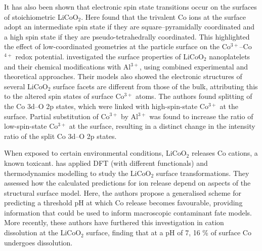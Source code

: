 \documentclass[../main.tex]{subfiles}
\begin{document}
It has also been shown that electronic spin state transitions occur on the surfaces of stoichiometric LiCoO$_2$. Here \citeauthor{qian2012electronic} found that the trivalent Co ions at the surface adopt an intermediate spin state if they are square–pyramidally coordinated and a high spin state if they are pseudo-tetrahedrally coordinated. This highlighted the effect of low-coordinated geometries at the particle surface on the Co$^{3+}$–Co$^{4+}$ redox potential.\cite{qian2012electronic} \citeauthor{hong2019electronic} investigated the surface properties of LiCoO$_2$ nanoplatelets and their chemical modifications with Al$^{3+}$, using combined experimental and theoretical approaches.\cite{hong2019electronic} Their models also showed the electronic structures of several LiCoO$_2$ surface facets are different from those of the bulk, attributing this to the altered spin states of surface Co$^{3+}$ atoms. The authors found splitting of the Co 3d–O 2p states, which were linked with high-spin-state Co$^{3+}$ at the surface. Partial substitution of Co$^{3+}$ by Al$^{3+}$ was found to increase the ratio of low-spin-state Co$^{3+}$ at the surface, resulting in a distinct change in the intensity ratio of the split Co 3d–O 2p states. 

When exposed to certain environmental conditions, LiCoO$_2$ releases Co cations, a known toxicant. \citeauthor{abbaspour2020dft} has applied DFT (with different functionals) and thermodynamics modelling to study the LiCoO$_2$ surface transformations. \cite{abbaspour2020dft} They assessed how the calculated predictions for ion release depend on aspects of the structural surface model. Here, the authors propose a generalised scheme for predicting a threshold pH at which Co release becomes favourable, providing information that could be used to inform macroscopic contaminant fate models. More recently, these authors have furthered this investigation in cation dissolution at the LiCoO$_2$ surface, finding that at a pH of 7, 16 \% of surface Co undergoes dissolution.\cite{abbaspour2020dft}
\end{document}
